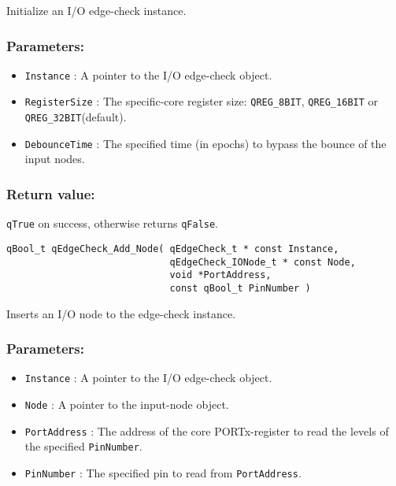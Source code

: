 Initialize an I/O edge-check instance. 

\subsubsection*{Parameters:}
\begin{itemize}
    \item \lstinline{Instance} : A pointer to the I/O edge-check object.
    \item \lstinline{RegisterSize} : The specific-core register size: \lstinline{QREG_8BIT}, \lstinline{QREG_16BIT} or \lstinline{QREG_32BIT}(default).
    \item \lstinline{DebounceTime} : The specified time (in epochs) to bypass the bounce of the input nodes.
\end{itemize}

\subsubsection*{Return value:}
\lstinline{qTrue} on success, otherwise returns \lstinline{qFalse}.

\noindent\hrulefill

\begin{lstlisting}[style=CStyle]
qBool_t qEdgeCheck_Add_Node( qEdgeCheck_t * const Instance, 
                             qEdgeCheck_IONode_t * const Node, 
                             void *PortAddress, 
                             const qBool_t PinNumber )
\end{lstlisting}

Inserts an I/O node to the edge-check instance. 

\subsubsection*{Parameters:}
\begin{itemize}
    \item \lstinline{Instance} : A pointer to the I/O edge-check object.
    \item \lstinline{Node} :  A pointer to the input-node object.
    \item \lstinline{PortAddress} : The address of the core PORTx-register to read the levels of the specified \lstinline{PinNumber}.
    \item \lstinline{PinNumber} : The specified pin to read from \lstinline{PortAddress}.
\end{itemize}

